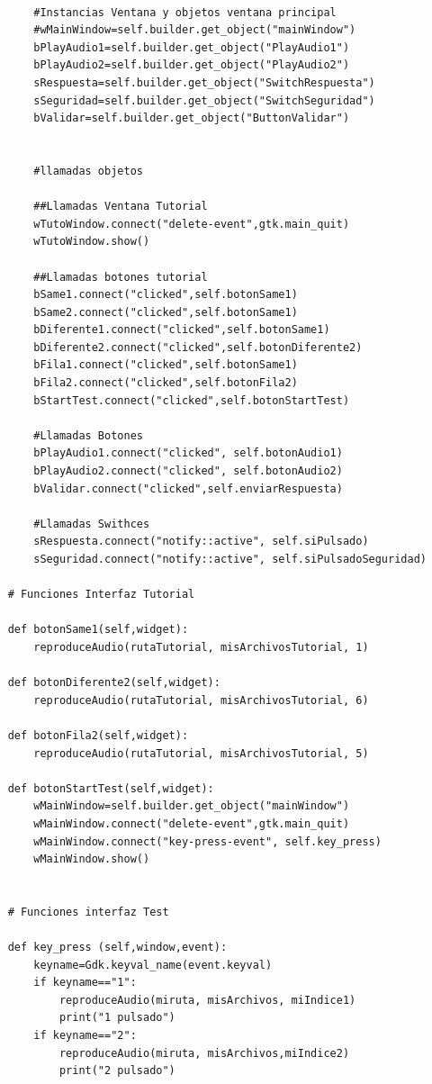 \documentclass[11pt,a4paper]{book}
\begin{document}
\begin{verbatim}
        
        #Instancias Ventana y objetos ventana principal
        #wMainWindow=self.builder.get_object("mainWindow")
        bPlayAudio1=self.builder.get_object("PlayAudio1")
        bPlayAudio2=self.builder.get_object("PlayAudio2")
        sRespuesta=self.builder.get_object("SwitchRespuesta")
        sSeguridad=self.builder.get_object("SwitchSeguridad")
        bValidar=self.builder.get_object("ButtonValidar")


        #llamadas objetos
        
        ##Llamadas Ventana Tutorial
        wTutoWindow.connect("delete-event",gtk.main_quit)
        wTutoWindow.show()
        
        ##Llamadas botones tutorial
        bSame1.connect("clicked",self.botonSame1)
        bSame2.connect("clicked",self.botonSame1)
        bDiferente1.connect("clicked",self.botonSame1)
        bDiferente2.connect("clicked",self.botonDiferente2)
        bFila1.connect("clicked",self.botonSame1)
        bFila2.connect("clicked",self.botonFila2)
        bStartTest.connect("clicked",self.botonStartTest)

        #Llamadas Botones
        bPlayAudio1.connect("clicked", self.botonAudio1)
        bPlayAudio2.connect("clicked", self.botonAudio2)
        bValidar.connect("clicked",self.enviarRespuesta)

        #Llamadas Swithces
        sRespuesta.connect("notify::active", self.siPulsado)
        sSeguridad.connect("notify::active", self.siPulsadoSeguridad)
        
    # Funciones Interfaz Tutorial
    
    def botonSame1(self,widget):
        reproduceAudio(rutaTutorial, misArchivosTutorial, 1)
        
    def botonDiferente2(self,widget):
        reproduceAudio(rutaTutorial, misArchivosTutorial, 6)
        
    def botonFila2(self,widget):
        reproduceAudio(rutaTutorial, misArchivosTutorial, 5)
        
    def botonStartTest(self,widget):
        wMainWindow=self.builder.get_object("mainWindow")
        wMainWindow.connect("delete-event",gtk.main_quit)
        wMainWindow.connect("key-press-event", self.key_press)
        wMainWindow.show()
        
         
    # Funciones interfaz Test

    def key_press (self,window,event):
        keyname=Gdk.keyval_name(event.keyval)
        if keyname=="1":
            reproduceAudio(miruta, misArchivos, miIndice1)
            print("1 pulsado")
        if keyname=="2":
            reproduceAudio(miruta, misArchivos,miIndice2)
            print("2 pulsado")
            

\end{verbatim}
\end{document}
